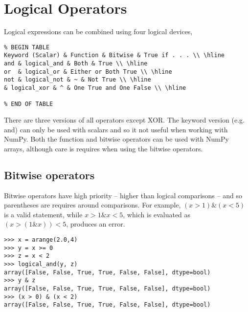 \documentclass[KSmain.tex]{subfiles}
\begin{document}
 



\section{Logical Operators}

Logical expressions can be combined using four logical devices,

\begin{verbatim}
% BEGIN TABLE
Keyword (Scalar) & Function & Bitwise & True if . . . \\ \hline
and & logical_and & Both & True \\ \hline
or  & logical_or & Either or Both True \\ \hline
not & logical_not & ~ & Not True \\ \hline
& logical_xor & ^ & One True and One False \\ \hline

% END OF TABLE
\end{verbatim}
There are three versions of all operators except XOR. The keyword version (e.g. and) can only be used
with scalars and so it not useful when working with NumPy. Both the function and bitwise operators
can be used with NumPy arrays, although care is requires when using the bitwise operators.
 \subsection{Bitwise operators}
Bitwise operators have high priority – higher than logical comparisons – and so parentheses are requires around
comparisons. 
For example, $(x>1) \& (x<5)$ is a valid statement, while $x>1 \& x<5$, which is evaluated as
$(x>(1 \& x))<5$, produces an error.
\begin{framed}
\begin{verbatim}
>>> x = arange(2.0,4)
>>> y = x >= 0
>>> z = x < 2
>>> logical_and(y, z)
array([False, False, True, True, False, False], dtype=bool)
>>> y & z
array([False, False, True, True, False, False], dtype=bool)
>>> (x > 0) & (x < 2)
array([False, False, True, True, False, False], dtype=bool)
\end{verbatim}
\end{framed}
\end{document}
